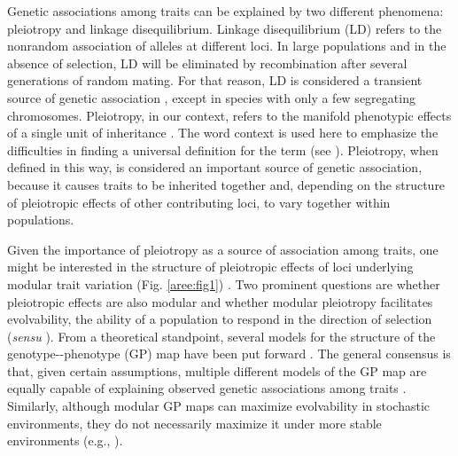 \begin{refsection}
Genetic associations among traits can be explained by two different
phenomena: pleiotropy and linkage disequilibrium. Linkage disequilibrium
(LD) refers to the nonrandom association of alleles at different loci.
In large populations and in the absence of selection, LD will be
eliminated by recombination after several generations of random mating.
For that reason, LD is considered a transient source of genetic
association \parencite{Cheverud1996-jw}, except in
species with only a few segregating chromosomes. Pleiotropy, in our
context, refers to the manifold phenotypic effects of a single unit of
inheritance \parencite{Stearns2010-yc}. The word
context is used here to emphasize the difficulties in finding a
universal definition for the term (see \textcite{Paaby2013-cj}). Pleiotropy,
when defined in this way, is considered an important source of genetic
association, because it causes traits to be inherited together and,
depending on the structure of pleiotropic effects of other contributing
loci, to vary together within populations.

Given the importance of pleiotropy as a source of association among
traits, one might be interested in the structure of pleiotropic effects
of loci underlying modular trait variation
(Fig. \ref{aree:fig1})
\parencite{Wagner1996-ui}. Two
prominent questions are whether pleiotropic effects are also modular and
whether modular pleiotropy facilitates evolvability, the ability of a
population to respond in the direction of selection (\emph{sensu} \textcite{Hansen2003-fh}). 
From a theoretical standpoint, several models for the structure
of the genotype-\/-phenotype (GP) map have been put forward
\parencite{Hansen2003-fh, Mitteroecker2009-jb, Pavlicev2011-xm}. The general
consensus is that, given certain assumptions, multiple different models
of the GP map are equally capable of explaining observed genetic
associations among traits \parencite{Mitteroecker2009-jb}. Similarly, although modular GP maps can maximize evolvability in stochastic environments, they do not necessarily maximize it under
more stable environments (e.g., \textcite{Hansen2003-fh}).


\end{refsection}
